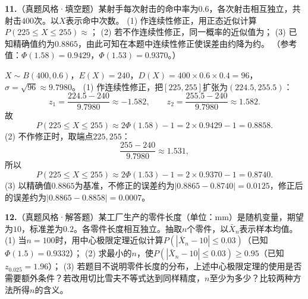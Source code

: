 \vspace{0.4cm}

\else \answerarea[6] \fi%
%
\textbf{11.}（真题风格·填空题）某射手每次射击的命中率为$0.6$，各次射击相互独立，共射击$400$次。以$X$表示命中次数。
(1) 作连续性修正，用正态近似计算$P(225\leq X\leq255)\approx$\underline{\qquad\qquad}；
(2) 若不作连续性修正，同一概率的近似值为\underline{\qquad\qquad}；
(3) 已知精确值约为$0.8865$，由此可知在本题中连续性修正使误差由约\underline{\qquad\qquad}降为约\underline{\qquad\qquad}。
（参考值：$\Phi(1.58)=0.9429$，$\Phi(1.53)=0.9370$。）

\ifshowsolutions%
$X\sim B(400,0.6)$，$E(X)=240$，$D(X)=400\times0.6\times0.4=96$，$\sigma=\sqrt{96}\approx9.7980$。
(1) 作连续性修正，把$[225,255]$扩张为$(224.5,255.5)$：
\[
z_1=\frac{224.5-240}{9.7980}\approx-1.582,\qquad
z_2=\frac{255.5-240}{9.7980}\approx1.582.
\]
故
\[
P(225\leq X\leq255)\approx2\Phi(1.58)-1=2\times0.9429-1=0.8858.
\]
(2) 不作修正时，取端点$225,255$：
\[
\frac{255-240}{9.7980}\approx1.531,
\]
所以
\[
P(225\leq X\leq255)\approx2\Phi(1.53)-1=2\times0.9370-1=0.8740.
\]
(3) 以精确值$0.8865$为基准，不修正的误差约为$|0.8865-0.8740|=0.0125$，修正后的误差约为$|0.8865-0.8858|=0.0007$。
\par\noindent{}

\vspace{0.4cm}

\else \answerarea[8] \fi%
%
\textbf{12.}（真题风格·解答题）某工厂生产的零件长度（单位：mm）是随机变量，期望为$10$，标准差为$0.2$。各零件长度相互独立。抽取$n$个零件，以$\bar X_n$表示样本均值。
(1) 当$n=100$时，用中心极限定理近似计算$P(|\bar X_n-10|\leq0.03)$（已知$\Phi(1.5)=0.9332$）；
(2) 求最小的$n$，使$P(|\bar X_n-10|\leq0.03)\geq0.95$（已知$z_{0.025}=1.96$）；
(3) 若题目不说明零件长度的分布，上述中心极限定理的使用是否需要额外条件？若改用切比雪夫不等式达到同样精度，$n$至少为多少？比较两种方法所得$n$的含义。

